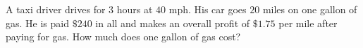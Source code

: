A taxi driver drives for $3$ hours at $40$ mph. His car goes $20$ miles on one gallon of gas. He is paid $\$240$ in all and makes an overall profit of $\$1.75$ per mile after paying for gas. How much does one gallon of gas cost?
